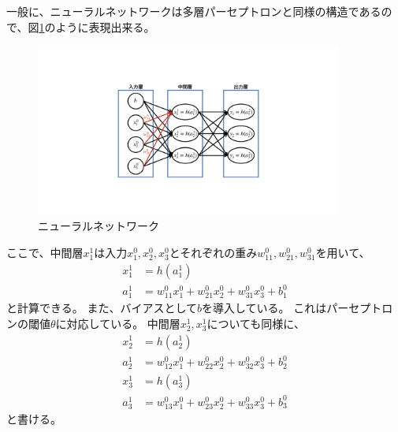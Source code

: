 一般に、ニューラルネットワークは多層パーセプトロンと同様の構造であるので、図\ref{6NeuralNetwork}のように表現出来る。

\begin{figure}[h]
 \centering
 \includegraphics[trim = 250 200 250 200, width=0.9\textwidth, clip]{Figure/2DeepLearning/6NeuralNetwork.png}
 \caption{ニューラルネットワーク}
 \label{6NeuralNetwork}
\end{figure}

ここで、中間層$x^1_1$は入力$x^0_1,x^0_2,x^0_3$とそれぞれの重み$w^0_{11},w^0_{21},w^0_{31}$を用いて、
\begin{equation}
 \begin{split}
  x^1_1 &= h(a^1_1)\\
  a^1_1 &= w^0_{11}x^0_1 + w^0_{21}x^0_2 + w^0_{31}x^0_3 + b^0_1
 \end{split}
\end{equation}
と計算できる。
また、バイアスとして$b$を導入している。
これはパーセプトロンの閾値$\theta$に対応している。
中間層$x^1_2,x^1_3$についても同様に、
\begin{equation}
 \begin{split}
  x^1_2 &= h(a^1_2)\\
  a^1_2 &= w^0_{12}x^0_1 + w^0_{22}x^0_2 + w^0_{32}x^0_3 + b^0_2\\
  x^1_3 &= h(a^1_3)\\
  a^1_3 &= w^0_{13}x^0_1 + w^0_{23}x^0_2 + w^0_{33}x^0_3 + b^0_3
 \end{split}
\end{equation}
と書ける。

